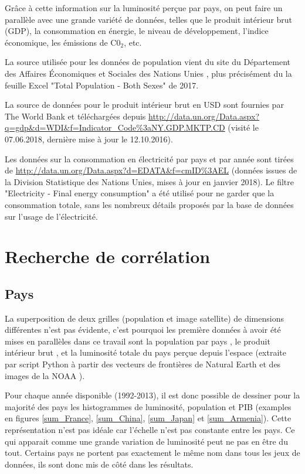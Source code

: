 \documentclass[a4paper]{report}
\begin{document}
Grâce à cette information sur la luminosité perçue par pays, on peut faire un parallèle avec une grande variété de données, telles que le produit intérieur brut (GDP), la consommation en énergie, le niveau de développement, l'indice économique, les émissions de C0$_2$, etc.

La source utilisée pour les données de population vient du site du Département des Affaires Économiques et Sociales des Nations Unies \cite{un-wpp}, plus précisément du la feuille Excel "Total Population - Both Sexes" de 2017.

La source de données pour le produit intérieur brut en USD sont fournies par The World Bank \cite{theworldbank} et téléchargées depuis \url{http://data.un.org/Data.aspx?q=gdp&d=WDI&f=Indicator_Code%3aNY.GDP.MKTP.CD} (visité le 07.06.2018, dernière mise à jour le 12.10.2016).

Les données sur la consommation en électricité par pays et par année sont tirées de \url{http://data.un.org/Data.aspx?d=EDATA&f=cmID%3AEL} (données issues de la Division Statistique des Nations Unies, mises à jour en janvier 2018). Le filtre "Electricity - Final energy consumption" a été utilisé pour ne garder que la consommation totale, sans les nombreux détails proposés par la base de données sur l'usage de l'électricité.

\section{Recherche de corrélation}
\subsection{Pays}
La superposition de deux grilles (population et image satellite) de dimensions différentes n'est pas évidente, c'est pourquoi les première données à avoir été mises en parallèles dans ce travail sont la population par pays \cite{un-wpp}, le produit intérieur brut \cite{theworldbank}, et la luminosité totale du pays perçue depuis l'espace (extraite par script Python à partir des vecteurs de frontières de Natural Earth \cite{naturalearthdata} et des images de la NOAA \cite{noaa}).

Pour chaque année disponible (1992-2013), il est donc possible de dessiner pour la majorité des pays les histogrammes de luminosité, population et PIB (examples en figures \ref{sum_France}, \ref{sum_China}, \ref{sum_Japan} et \ref{sum_Armenia}). Cette représentation n'est pas idéale car l'échelle n'est pas constante entre les pays. Ce qui apparait comme une grande variation de luminosité peut ne pas en être du tout. Certains pays ne portent pas exactement le même nom dans tous les jeux de données, ils sont donc mis de côté dans les résultats.
\end{document}

